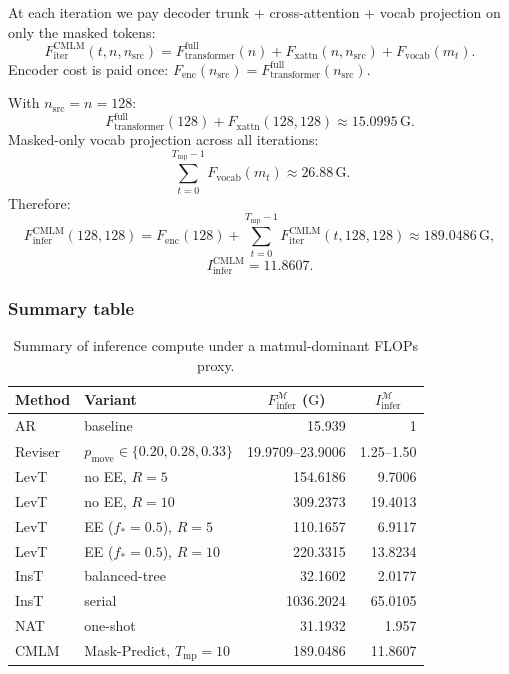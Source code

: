 \documentclass[11pt]{article}
\newcommand{\G}{\mathrm{G}} %
\begin{document}
At each iteration we pay decoder trunk + cross-attention + vocab projection on only the masked tokens:
\[
F_{\text{iter}}^{\text{CMLM}}(t, n, n_{\text{src}})
=
F_{\text{transformer}}^{\text{full}}(n)
+
F_{\text{xattn}}(n,n_{\text{src}})
+
F_{\text{vocab}}(m_t).
\]
Encoder cost is paid once:
$F_{\text{enc}}(n_{\text{src}})=F_{\text{transformer}}^{\text{full}}(n_{\text{src}})$.

With $n_{\text{src}}=n=128$:
\[
F_{\text{transformer}}^{\text{full}}(128)+F_{\text{xattn}}(128,128)\approx \num{15.0995}\,\G.
\]
Masked-only vocab projection across all iterations:
\[
\sum_{t=0}^{T_{\text{mp}}-1} F_{\text{vocab}}(m_t)
\approx \num{26.88}\,\G.
\]
Therefore:
\[
F_{\text{infer}}^{\text{CMLM}}(128,128)
=
F_{\text{enc}}(128)+\sum_{t=0}^{T_{\text{mp}}-1}F_{\text{iter}}^{\text{CMLM}}(t,128,128)
\approx
\num{189.0486}\,\G,
\]
\[
I_{\text{infer}}^{\text{CMLM}}=\num{11.8607}.
\]

\subsubsection{Summary table}
\label{app:prior_art_table}

\begin{table}[t]
\centering
\small
\setlength{\tabcolsep}{4pt}
\begin{tabular}{llrr}
\toprule
Method & Variant
& \multicolumn{1}{c}{$F_{\text{infer}}^{\mathcal{M}}$ ($\G$)}
& \multicolumn{1}{c}{$I_{\text{infer}}^{\mathcal{M}}$} \\
\midrule
AR & baseline
& \num{15.939} & 1 \\
\midrule
Reviser & $p_{\text{move}}\in\{0.20,0.28,0.33\}$
& \num{19.9709}--\num{23.9006} & \num{1.25}--\num{1.50} \\
\midrule
LevT & no EE, $R=5$
& \num{154.6186} & \num{9.7006} \\
LevT & no EE, $R=10$
& \num{309.2373} & \num{19.4013} \\
LevT & EE ($f_{\ast} = 0.5$), $R=5$
& \num{110.1657} & \num{6.9117} \\
LevT & EE ($f_{\ast} = 0.5$), $R=10$
& \num{220.3315} & \num{13.8234} \\
\midrule
InsT & balanced-tree
& \num{32.1602} & \num{2.0177} \\
InsT & serial
& \num{1036.2024} & \num{65.0105} \\
\midrule
NAT & one-shot
& \num{31.1932} & \num{1.957} \\
\midrule
CMLM & Mask-Predict, $T_{\text{mp}}=10$
& \num{189.0486} & \num{11.8607} \\
\bottomrule
\end{tabular}
\caption{Summary of inference compute under a matmul-dominant FLOPs proxy.}
\end{table}
\end{document}
